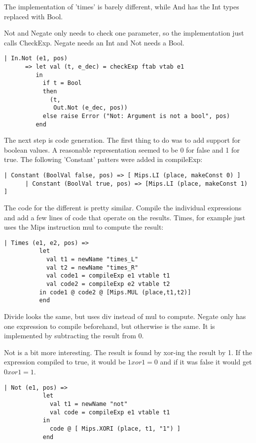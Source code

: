 \documentclass[10pt]{article}
\begin{document}
The implementation of 'times' is barely different, while And has the Int types replaced with Bool. 

Not and Negate only needs to check one parameter, so the implementation just calls CheckExp. Negate needs an Int and Not needs a Bool.

\begin{Verbatim}[frame=single]
   | In.Not (e1, pos)
      => let val (t, e_dec) = checkExp ftab vtab e1
         in
           if t = Bool
           then
             (t,
              Out.Not (e_dec, pos))
           else raise Error ("Not: Argument is not a bool", pos)
         end
\end{Verbatim}

The next step is  code generation. The first thing to do was to add support for boolean values. A reasonable representation seemed to be 0 for false and 
1 for true. The following 'Constant' patters were added in compileExp:

\begin{Verbatim}[frame=single]
      | Constant (BoolVal false, pos) => [ Mips.LI (place, makeConst 0) ] 
      | Constant (BoolVal true, pos) => [Mips.LI (place, makeConst 1) ] 
\end{Verbatim}

The code for the different is pretty similar. Compile the individual expressions and add a few lines of code that operate on the results. Times, for example just uses the Mips instruction mul to compute the result:

\begin{Verbatim}[frame=single]
      | Times (e1, e2, pos) =>
          let
            val t1 = newName "times_L"
            val t2 = newName "times_R"
            val code1 = compileExp e1 vtable t1
            val code2 = compileExp e2 vtable t2
          in code1 @ code2 @ [Mips.MUL (place,t1,t2)]
          end
\end{Verbatim}

Divide looks the same, but uses div instead of mul to compute. Negate only has one expression to compile beforehand, but otherwise is the same. It is implemented by subtracting the result from 0.

Not is a bit more interesting. The result is found by xor-ing the result by 1. If the expression compiled to true, it would be $1 xor 1 = 0$ and if it was false it would get $0 xor 1 = 1$.

\begin{Verbatim}[frame=single]
       | Not (e1, pos) =>
           let
             val t1 = newName "not"
             val code = compileExp e1 vtable t1
           in
             code @ [ Mips.XORI (place, t1, "1") ]
           end
\end{Verbatim}
\end{document}
